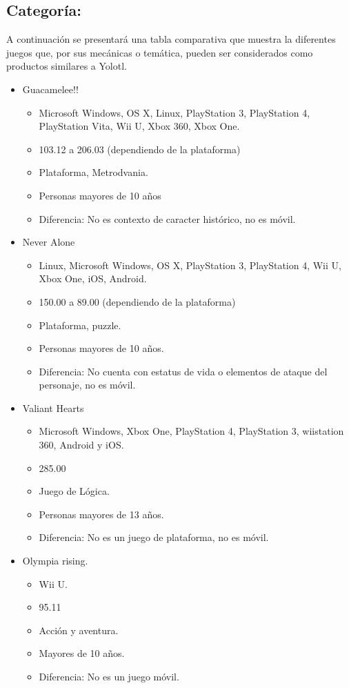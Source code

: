 \documentclass[11pt,letterpaper]{article}
\begin{document}
	\subsection{Categoría:}
A continuación se presentará una tabla comparativa que muestra la diferentes juegos que, por sus mecánicas o temática, pueden ser considerados como productos similares a Yolotl.
\begin{itemize}
	\item Guacamelee!!
	\begin{itemize}
		\item Microsoft Windows, OS X, Linux, PlayStation 3, PlayStation 4, PlayStation Vita, Wii U, Xbox 360, Xbox One.
		\item 103.12 a 206.03 (dependiendo de la plataforma)
		\item Plataforma, Metrodvania.
		\item Personas mayores de 10 años
		\item Diferencia: No es contexto de caracter histórico, no es móvil.
	\end{itemize}

\item Never Alone
\begin{itemize}
	\item Linux, Microsoft Windows, OS X, PlayStation 3, PlayStation 4, Wii U, Xbox One, iOS, Android.
	\item 150.00 a 89.00 (dependiendo de la plataforma)
	\item Plataforma, puzzle.
	\item Personas mayores de 10 años.
	\item Diferencia: No cuenta con estatus de vida o elementos de ataque del personaje, no es móvil.
\end{itemize}


\item Valiant Hearts
\begin{itemize}
	\item Microsoft Windows, Xbox One, PlayStation 4, PlayStation 3, wiistation 360, Android y iOS.
	\item 285.00
	\item Juego de Lógica. 
	\item Personas mayores de 13 años.
	\item Diferencia: No es un juego de plataforma, no es móvil.
\end{itemize}


\item Olympia rising.
\begin{itemize}
	\item Wii U.
	\item 95.11
	\item Acción y aventura.
	\item Mayores de 10 años.
	\item Diferencia: No es un juego móvil.
\end{itemize}



\end{itemize}
\end{document}
